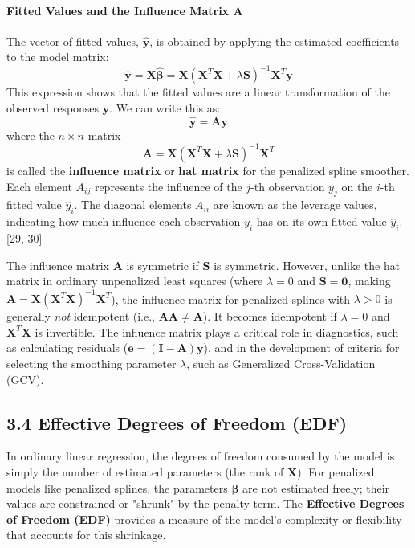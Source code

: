 \documentclass[11pt, a4paper]{article}
\begin{document}
\paragraph{Fitted Values and the Influence Matrix $\mathbf{A}$}
The vector of fitted values, $\hat{\mathbf{y}}$, is obtained by applying the estimated coefficients to the model matrix:
\[ \hat{\mathbf{y}} = \mathbf{X}\hat{\boldsymbol{\beta}} = \mathbf{X}(\mathbf{X}^T\mathbf{X} + \lambda\mathbf{S})^{-1}\mathbf{X}^T\mathbf{y} \]
This expression shows that the fitted values are a linear transformation of the observed responses $\mathbf{y}$. We can write this as:
\[ \hat{\mathbf{y}} = \mathbf{A}\mathbf{y} \]
where the $n \times n$ matrix
\[ \mathbf{A} = \mathbf{X}(\mathbf{X}^T\mathbf{X} + \lambda\mathbf{S})^{-1}\mathbf{X}^T \]
is called the \textbf{influence matrix} or \textbf{hat matrix} for the penalized spline smoother. Each element $A_{ij}$ represents the influence of the $j$-th observation $y_j$ on the $i$-th fitted value $\hat{y}_i$. The diagonal elements $A_{ii}$ are known as the leverage values, indicating how much influence each observation $y_i$ has on its own fitted value $\hat{y}_i$.[29, 30]

The influence matrix $\mathbf{A}$ is symmetric if $\mathbf{S}$ is symmetric. However, unlike the hat matrix in ordinary unpenalized least squares (where $\lambda=0$ and $\mathbf{S}=\mathbf{0}$, making $\mathbf{A} = \mathbf{X}(\mathbf{X}^T\mathbf{X})^{-1}\mathbf{X}^T$), the influence matrix for penalized splines with $\lambda > 0$ is generally \textit{not} idempotent (i.e., $\mathbf{A}\mathbf{A} \neq \mathbf{A}$). It becomes idempotent if $\lambda=0$ and $\mathbf{X}^T\mathbf{X}$ is invertible. The influence matrix plays a critical role in diagnostics, such as calculating residuals ($\mathbf{e} = (\mathbf{I}-\mathbf{A})\mathbf{y}$), and in the development of criteria for selecting the smoothing parameter $\lambda$, such as Generalized Cross-Validation (GCV).

\subsection{3.4 Effective Degrees of Freedom (EDF)}
In ordinary linear regression, the degrees of freedom consumed by the model is simply the number of estimated parameters (the rank of $\mathbf{X}$). For penalized models like penalized splines, the parameters $\boldsymbol{\beta}$ are not estimated freely; their values are constrained or "shrunk" by the penalty term. The \textbf{Effective Degrees of Freedom (EDF)} provides a measure of the model's complexity or flexibility that accounts for this shrinkage.
\end{document}
